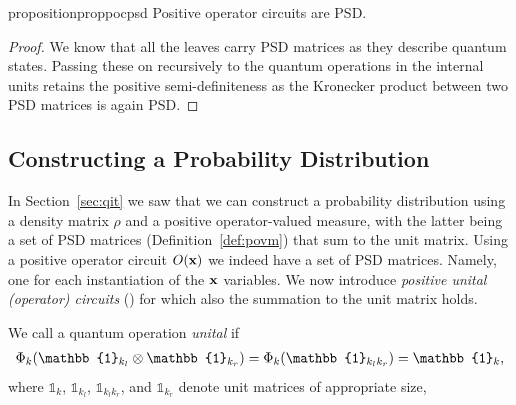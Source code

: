 


\begin{restatable}{proposition}{proppocpsd}
	\label{prop:pocpsd}
	Positive operator circuits are PSD.
\end{restatable}


\begin{proof}
	We know that all the leaves carry PSD matrices as they describe quantum states. Passing these on recursively to the quantum operations in the internal units retains the positive semi-definiteness as the Kronecker product between two PSD matrices is again PSD.
\end{proof}






\subsection{Constructing a Probability Distribution}


In Section~\ref{sec:qit} we saw that we can construct a probability distribution using a density matrix $\rho$ and a positive operator-valued measure, with the latter being a set of PSD matrices (\cf Definition~\ref{def:povm}) that sum to the unit matrix. Using a positive operator circuit $O(\mathbf{x})$ we indeed have a set of PSD matrices. Namely, one for each instantiation of the $\mathbf{x}$ variables. We now introduce \textit{positive unital (operator) circuits} (\puncs) for which also the summation to the unit matrix holds.

\begin{definition}
	\label{def:cp_unital}
	We call a quantum operation \textit{unital} if
	\begin{align}
		\qop_k(\mathbb{1}_{k_l} \otimes \mathbb{1}_{k_r})
		=\qop_k(\mathbb{1}_{k_l k_r})
		=  \mathbb{1}_k,
	\end{align}
	where $\mathbb{1}_{k}$, $\mathbb{1}_{k_l}$, $\mathbb{1}_{k_l k_r}$, and $\mathbb{1}_{k_r}$  denote unit matrices of appropriate size,
\end{definition}

